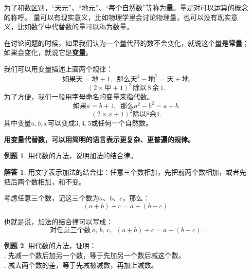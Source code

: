 \documentclass[12pt,UTF8]{ctexbook}
\theoremstyle{definition}
\newtheorem{et}{例题}[section]
\newtheorem*{so}{解答}
\theoremstyle{plain}
\begin{document}
为了和数区别，“天元”、“地元”、“每个自然数”等称为\textbf{量}。量是对可以运算的概念的称呼。
量可以有现实意义，比如物理学里会讨论物理量，也可以没有现实意义，比如数学中代替数的量可以称为数量。

在讨论问题的时候，如果我们认为一个量代替的数不会变化，就说这个量是\textbf{常量}；如果会变化，就说它是\textbf{变量}。

我们可以用变量描述上面两个规律：
$$ \mbox{如果天} = \mbox{地}+1, \,\,\,\mbox{那么}\mbox{天}^2 - \mbox{地}^2 = \mbox{天} + \mbox{地}. $$
$$  (2\times \mbox{甲} + 1)^2 \,\mbox{除以} \,8\,\mbox{余}\,1.$$
为了方便，我们一般用字母命名的变量来指代数。
$$ \mbox{如果} a = b+1, \,\,\,\mbox{那么} a^2 - b^2 = a + b. $$
$$  (2\times x + 1)^2 \mbox{除以} 8\mbox{余} 1.$$
其中变量$a,b,x$可以变成$3,4,5$或任何一个自然数。

\textbf{用变量代替数，可以用简明的语言表示更复杂、更普遍的规律。}

\begin{et}
    用代数的方法，说明加法的结合律。
\end{et}

\begin{so}
    用文字表示加法的结合律：任意三个数相加，先把前两个数相加，或者先把后两个数相加，和不变。

    考虑任意三个数，记这三个数为$a$、$b$、$c$，那么：
    $$ (a + b) + c = a + (b + c).$$

    也就是说，加法的结合律可以写成：
    $$ \mbox{对任意三个数}\,a,\,b,\,c, \,\,\, (a + b) + c = a + (b + c).$$

\end{so}

\begin{et}
    用代数的方法，证明：\\
    . 先减一个数后加另一个数，等于先加另一个数后减这个数。\\
    . 减去两个数的差，等于先减被减数，再加上减数。\\
\end{et}
\end{document}
